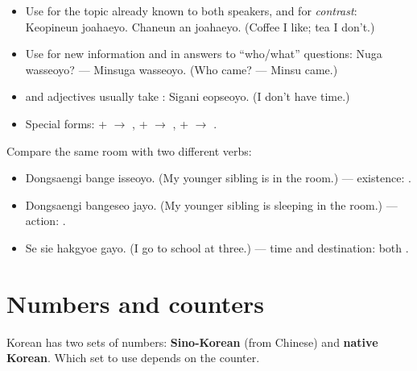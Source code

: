 \begin{important}[\ko{은/는} versus \ko{이/가}]
\begin{itemize}
  \item Use  for the topic already known to both speakers, and for
        \emph{contrast}:  Keopineun joahaeyo.
        Chaneun an joahaeyo. (Coffee I like; tea I don't.)
  \item Use  for new information and in answers to ``who/what'' questions:
         Nuga wasseoyo? --- Minsuga wasseoyo. (Who
        came? --- Minsu came.)
  \item {} and adjectives usually take :  Sigani
        eopseoyo. (I don't have time.)
  \item Special forms:  +  $\to$ ,  +  $\to$
        ,  +  $\to$ .
\end{itemize}
\end{important}

\begin{example}[\ko{에} versus \ko{에서}]
Compare the same room with two different verbs:
\begin{itemize}
  \item {} Dongsaengi bange isseoyo. (My younger sibling is in the
        room.) --- existence: .
  \item {} Dongsaengi bangeseo jayo. (My younger sibling is sleeping
        in the room.) --- action: .
  \item {} Se sie hakgyoe gayo. (I go to school at three.) ---
        time and destination: both .
\end{itemize}
\end{example}

\section{Numbers and counters}

Korean has two sets of numbers: \textbf{Sino-Korean} (from Chinese) and \textbf{native
Korean}. Which set to use depends on the counter.

